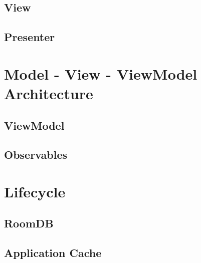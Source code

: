 \subsection{View}
\subsection{Presenter}
\section{Model - View - ViewModel Architecture}
\subsection{ViewModel}
\subsection{Observables}
\section{Lifecycle}

\subsection{RoomDB}
\subsection{Application Cache}




